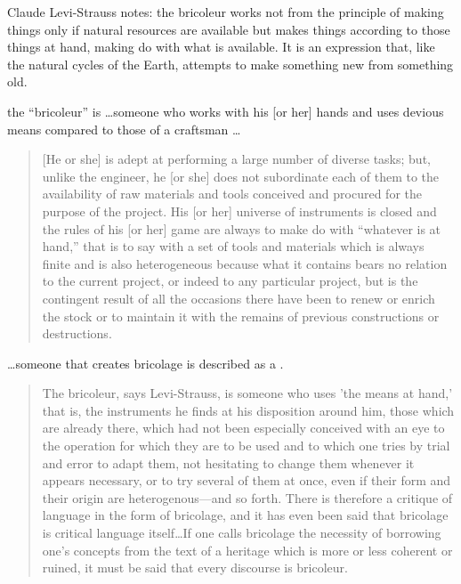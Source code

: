 Claude Levi-Strauss notes: the bricoleur works not from the principle of making things only if natural resources are available but makes things according to those things at hand, making do with what is available. It is an expression that, like the natural cycles of the Earth, attempts to make something new from something old. \cite{levi1966savage}

the “bricoleur” is \ldots someone who works with his [or her] hands and uses devious means compared to those of a craftsman \ldots \cite{levi1966savage}

\begin{quote}
[He or she] is adept at performing a large number of diverse tasks; but, unlike the engineer, he [or she] does not subordinate each of them to the availability of raw materials and tools conceived and procured for the purpose of the project. His [or her] universe of instruments is closed and the rules of his [or her] game are always to make do with “whatever is at hand,” that is to say with a set of tools and materials which is always finite and is also heterogeneous because what it contains bears no relation to the current project, or indeed to any particular project, but is the contingent result of all the occasions there have been to renew or enrich the stock or to maintain it with the remains of previous constructions or destructions.\cite{levi1966savage}
\end{quote}

\ldots someone that creates bricolage is described as a . 

\begin{quote}
The bricoleur, says Levi-Strauss, is someone who uses 'the means at hand,' that is, the instruments he finds at his disposition around him, those which are already there, which had not been especially conceived with an eye to the operation for which they are to be used and to which one tries by trial and error to adapt them, not hesitating to change them whenever it appears necessary, or to try several of them at once, even if their form and their origin are heterogenous---and so forth. There is therefore a critique of language in the form of bricolage, and it has even been said that bricolage is critical language itself\ldots If one calls bricolage the necessity of borrowing one's concepts from the text of a heritage which is more or less coherent or ruined, it must be said that every discourse is bricoleur.\cite{derrida1993structure}
\end{quote}

